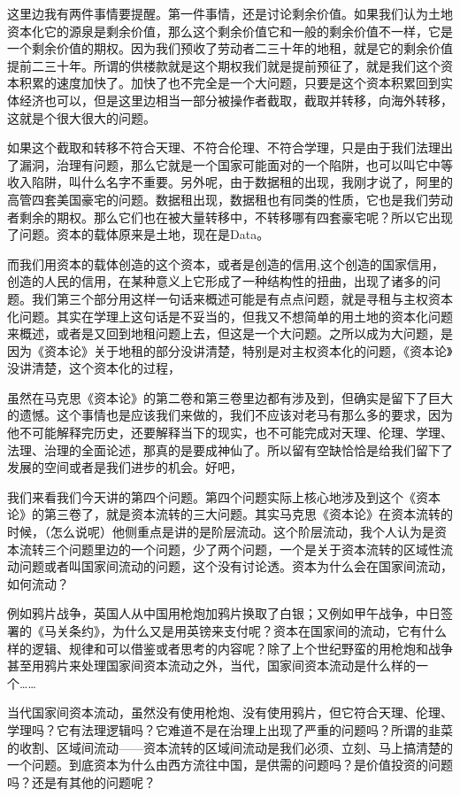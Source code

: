 \documentclass[UTF8, 12pt, a4paper]{ctexrep}
\begin{document}
这里边我有两件事情要提醒。第一件事情，还是讨论剩余价值。如果我们认为土地资本化它的源泉是剩余价值，那么这个剩余价值它和一般的剩余价值不一样，它是一个剩余价值的期权。因为我们预收了劳动者二三十年的地租，就是它的剩余价值提前二三十年。所谓的供楼款就是这个期权我们就是提前预征了，就是我们这个资本积累的速度加快了。加快了也不完全是一个大问题，只要是这个资本积累回到实体经济也可以，但是这里边相当一部分被操作者截取，截取并转移，向海外转移，这就是个很大很大的问题。

如果这个截取和转移不符合天理、不符合伦理、不符合学理，只是由于我们法理出了漏洞，治理有问题，那么它就是一个国家可能面对的一个陷阱，也可以叫它中等收入陷阱，叫什么名字不重要。另外呢，由于数据租的出现，我刚才说了，阿里的高管四套美国豪宅的问题。数据租出现，数据租也有同类的性质，它也是我们劳动者剩余的期权。那么它们也在被大量转移中，不转移哪有四套豪宅呢？所以它出现了问题。资本的载体原来是土地，现在是Data。

而我们用资本的载体创造的这个资本，或者是创造的信用,这个创造的国家信用，创造的人民的信用，在某种意义上它形成了一种结构性的扭曲，出现了诸多的问题。我们第三个部分用这样一句话来概述可能是有点点问题，就是寻租与主权资本化问题。其实在学理上这句话是不妥当的，但我又不想简单的用土地的资本化问题来概述，或者是又回到地租问题上去，但这是一个大问题。之所以成为大问题，是因为《资本论》关于地租的部分没讲清楚，特别是对主权资本化的问题，《资本论》没讲清楚，这个资本化的过程，

虽然在马克思《资本论》的第二卷和第三卷里边都有涉及到，但确实是留下了巨大的遗憾。这个事情也是应该我们来做的，我们不应该对老马有那么多的要求，因为他不可能解释完历史，还要解释当下的现实，也不可能完成对天理、伦理、学理、法理、治理的全面论述，那真的是要成神仙了。所以留有空缺恰恰是给我们留下了发展的空间或者是我们进步的机会。好吧，

我们来看我们今天讲的第四个问题。第四个问题实际上核心地涉及到这个《资本论》的第三卷了，就是资本流转的三大问题。其实马克思《资本论》在资本流转的时候，（怎么说呢）他侧重点是讲的是阶层流动。这个阶层流动，我个人认为是资本流转三个问题里边的一个问题，少了两个问题，一个是关于资本流转的区域性流动问题或者叫国家间流动的问题，这个没有讨论透。资本为什么会在国家间流动，如何流动？

例如鸦片战争，英国人从中国用枪炮加鸦片换取了白银；又例如甲午战争，中日签署的《马关条约》，为什么又是用英镑来支付呢？资本在国家间的流动，它有什么样的逻辑、规律和可以借鉴或者思考的内容呢？除了上个世纪野蛮的用枪炮和战争甚至用鸦片来处理国家间资本流动之外，当代，国家间资本流动是什么样的一个……

当代国家间资本流动，虽然没有使用枪炮、没有使用鸦片，但它符合天理、伦理、学理吗？它有法理逻辑吗？它难道不是在治理上出现了严重的问题吗？所谓的韭菜的收割、区域间流动——资本流转的区域间流动是我们必须、立刻、马上搞清楚的一个问题。到底资本为什么由西方流往中国，是供需的问题吗？是价值投资的问题吗？还是有其他的问题呢？
\end{document}

